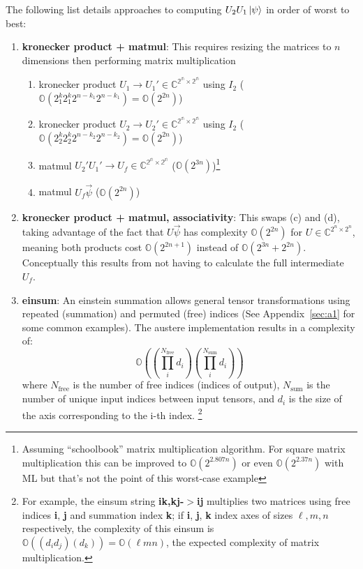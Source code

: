 \documentclass{article}
\begin{document}
The following list details approaches to computing $U_2 U_1 \ket{\psi}$ in order of worst to best:
\begin{enumerate}
	\item \textbf{kronecker product + matmul}: This requires resizing the matrices to $n$ dimensions then performing matrix multiplication
	\begin{enumerate}
		\item kronecker product $U_1 \rightarrow U_1' \in \mathbb{C^{2^n \times 2^n}}$ using $I_2$ ($\mathbb{O}(2^k_1 2^k_1 2^{n-k_1} 2^{n-k_1}) = \mathbb{O}(2^{2n})$)
		\item kronecker product $U_2 \rightarrow U_2' \in \mathbb{C^{2^n \times 2^n}}$ using $I_2$ ($\mathbb{O}(2^k_2 2^k_2 2^{n-k_2} 2^{n-k_2}) = \mathbb{O}(2^{2n})$)
		\item matmul $U_2' U_1' \rightarrow U_f \in \mathbb{C^{2^n \times 2^n}}$ ($\mathbb{O}(2^{3n})$)\footnote{Assuming ``schoolbook'' matrix multiplication algorithm. For square matrix multiplication this can be improved to $\mathbb{O}(2^{2.807n})$ or even $\mathbb{O}(2^{2.37n})$ with ML but that's not the point of this worst-case example}
		\item matmul $ U_f \vec{\psi}$ ($\mathbb{O}(2^{2n})$)
	\end{enumerate}
	\item \textbf{kronecker product + matmul, associativity}: This swaps (c) and (d), taking advantage of the fact that $U \vec{\psi}$ has complexity $\mathbb{O}(2^{2n})$ for $U \in \mathbb{C}^{2^n \times 2^n}$, meaning both products cost $\mathbb{O}(2^{2n + 1})$ instead of $\mathbb{O}(2^{3n} + 2^{2n})$. Conceptually this results from not having to calculate the full intermediate $U_f$.
	\item \textbf{einsum}: An einstein summation allows general tensor transformations using repeated (summation) and permuted (free) indices (See Appendix~\ref{sec:a1} for some common examples). The austere implementation results in a complexity of\cite{https://obilaniu6266h16.wordpress.com/2016/02/04/einstein-summation-in-numpy/}: 
		\begin{equation}
			\mathbb{O}\left( \left(\prod_i^{N_\text{free}} d_i\right) \left(\prod_i^{N_\text{sum}} d_i\right) \right)
		\end{equation}
		where $N_\text{free}$ is the number of free indices (indices of output), $N_\text{sum}$ is the number of unique input indices between input tensors, and $d_i$ is the size of the axis corresponding to the i-th index. \footnote{For example, the einsum string \textbf{ik,kj-$>$ij} multiplies two matrices using free indices \textbf{i}, \textbf{j} and summation index \textbf{k}; if \textbf{i}, \textbf{j}, \textbf{k} index axes of sizes $\ell,m,n$ respectively, the complexity of this einsum is 	$\mathbb{O}( (d_i d_j) (d_k) ) = \mathbb{O}( \ell mn)$, the expected complexity of matrix multiplication.}
		

\end{enumerate}
\end{document}
